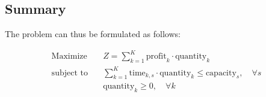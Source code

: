 \documentclass{article}
\begin{document}
\subsection*{Summary}
The problem can thus be formulated as follows:

\begin{align*}
\text{Maximize} & \quad Z = \sum_{k=1}^{K} \text{profit}_{k} \cdot \text{quantity}_{k} \\
\text{subject to} & \quad \sum_{k=1}^{K} \text{time}_{k,s} \cdot \text{quantity}_{k} \leq \text{capacity}_{s}, \quad \forall s \\
& \quad \text{quantity}_{k} \geq 0, \quad \forall k 
\end{align*}
\end{document}
